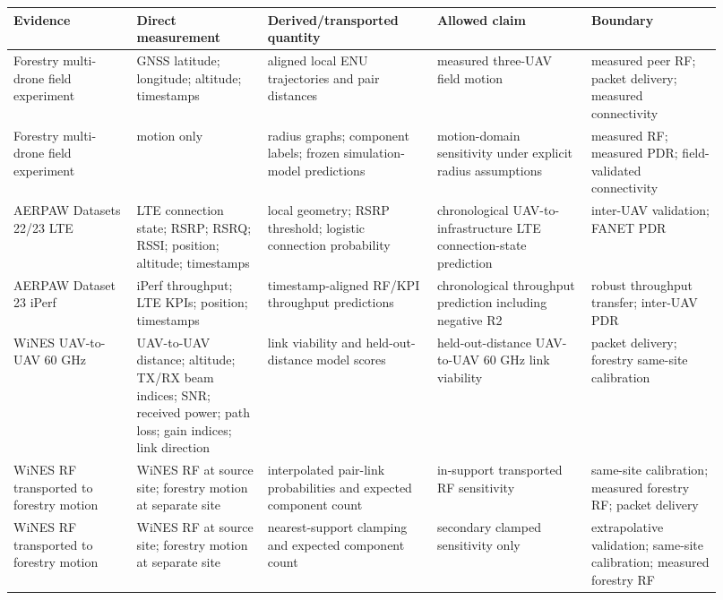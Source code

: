 \begin{tabular}{p{0.16\linewidth}p{0.17\linewidth}p{0.22\linewidth}p{0.20\linewidth}p{0.17\linewidth}}
\toprule
Evidence & Direct measurement & Derived/transported quantity & Allowed claim & Boundary \\
\midrule
Forestry multi-drone field experiment & GNSS latitude; longitude; altitude; timestamps & aligned local ENU trajectories and pair distances & measured three-UAV field motion & measured peer RF; packet delivery; measured connectivity \\
Forestry multi-drone field experiment & motion only & radius graphs; component labels; frozen simulation-model predictions & motion-domain sensitivity under explicit radius assumptions & measured RF; measured PDR; field-validated connectivity \\
AERPAW Datasets 22/23 LTE & LTE connection state; RSRP; RSRQ; RSSI; position; altitude; timestamps & local geometry; RSRP threshold; logistic connection probability & chronological UAV-to-infrastructure LTE connection-state prediction & inter-UAV validation; FANET PDR \\
AERPAW Dataset 23 iPerf & iPerf throughput; LTE KPIs; position; timestamps & timestamp-aligned RF/KPI throughput predictions & chronological throughput prediction including negative R2 & robust throughput transfer; inter-UAV PDR \\
WiNES UAV-to-UAV 60 GHz & UAV-to-UAV distance; altitude; TX/RX beam indices; SNR; received power; path loss; gain indices; link direction & link viability and held-out-distance model scores & held-out-distance UAV-to-UAV 60 GHz link viability & packet delivery; forestry same-site calibration \\
WiNES RF transported to forestry motion & WiNES RF at source site; forestry motion at separate site & interpolated pair-link probabilities and expected component count & in-support transported RF sensitivity & same-site calibration; measured forestry RF; packet delivery \\
WiNES RF transported to forestry motion & WiNES RF at source site; forestry motion at separate site & nearest-support clamping and expected component count & secondary clamped sensitivity only & extrapolative validation; same-site calibration; measured forestry RF \\
\bottomrule
\end{tabular}
